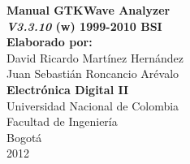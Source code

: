 \documentclass[10pt,graphicx,caption,rotating]{article}
\begin{document}
\begin{titlepage}
\begin{center}
{\huge \textbf{Manual GTKWave Analyzer}}\\
{\huge  \textbf {\textit{V3.3.10} (w) 1999-2010 BSI}}\\[7cm]
{\Large \textbf{Elaborado por:}}\\
{\Large David Ricardo Martínez Hernández}\\
{\Large Juan Sebastián Roncancio Arévalo}\\[6cm]
{\Large \textbf{Electrónica Digital II}}\\[6cm]
{\Large Universidad Nacional de Colombia}\\
{\Large Facultad de Ingeniería}\\
{\Large Bogotá}\\
{\Large 2012}\\
\date{}
\end{center}
\end{titlepage}

\tableofcontents
\listoffigures
\newpage
{}
\end{document}
